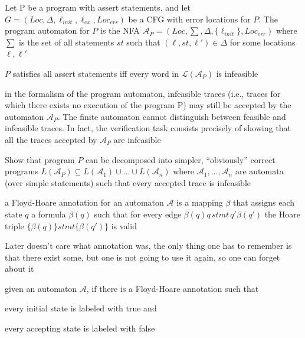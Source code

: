 \documentclass[landscape, a4paper]{article}
\begin{document}
\begin{minipage}[t]{0.2\linewidth}
\begin{betterlist}
		\item Let P be a program with assert statements, and let $G = (Loc, \Delta , \ell_{init}, \ell_{ex}, Loc_{err})$ be a CFG with error locations for $P$. \color{orange}The \alert{program automaton} for $P$ is the NFA $\mathcal{A}_P = (Loc, \sum , \Delta , \{ \ell_{init}\} , Loc_{err})$ where $\sum$ is the set of all statements $st$ such that $(\ell, st, \ell') \in \Delta$ for some locations $\ell, \ell'$\color{black}
		\begin{betterlist}
			\item $P$ satisfies all assert statements iff every word in $\mathcal{L}(\mathcal{A}_P)$ is infeasible
		\end{betterlist}
		\item in the formalism of the program automaton, infeasible traces (i.e., traces for which there exists no execution of the program P) may still be accepted by the automaton $\mathcal{A}_P$. The finite automaton cannot distinguish between feasible and infeasible traces. In fact, the verification task consists precisely of showing that all the traces accepted by $\mathcal{A}_P$ are infeasible
		\item Show that program $P$ can be decomposed into simpler, \enquote{obviously} correct programs $L(\mathcal{A}_P) \subseteq L(\mathcal{A}_1) \cup \ldots \cup L(\mathcal{A}_n)$ where $\mathcal{A}_1, \ldots , \mathcal{A}_n$ are automata (over simple statements) such that every accepted trace is infeasible
		\item \color{orange}a \alert{Floyd-Hoare annotation} for an automaton $\mathcal{A}$ is a mapping $\beta$ that assigns each state $q$ a formula $\beta(q)$ such that for every edge $\beta (q)q\, stmt\, q'\beta(q')$ the Hoare triple $\{\beta(q)\} stmt \{\beta(q′)\}$ is valid\color{black}
		\begin{betterlist}
			\item Later doesn't care what annotation was, the only thing one has to remember is that there exist some, but one is not going to use it again, so one can forget about it
		\end{betterlist}
		\item \color{violet}given an automaton $\mathcal{A}$, if there is a Floyd-Hoare annotation such that
		\begin{betterlist}
			\item every initial state is labeled with true and
			\item every accepting state is labeled with false
		\end{betterlist}

\end{betterlist}
\end{minipage}
\end{document}
